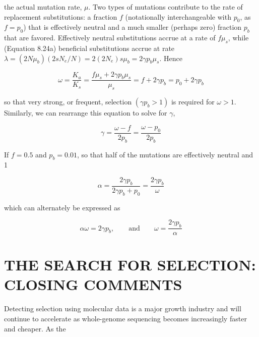 \documentclass{article}
\begin{document}
the actual mutation rate,  $ \mu $. Two types of mutations contribute to the rate of replacement substitutions: a fraction  $ f $ (notationally interchangeable with  $ p_0 $, as  $ f = p_0 $) that is effectively neutral and a much smaller (perhaps zero) fraction  $ p_b $ that are favored. Effectively neutral substitutions accrue at a rate of  $ f\mu_s $, while (Equation 8.24a) beneficial substitutions accrue at rate  $ \lambda = (2N\mu_b)(2sN_e/N) = 2(2N_e)s\mu_b = 2\gamma p_b\mu_s $. Hence

\begin{equation}
\omega=\frac{K_{a}}{K_{s}}=\frac{f\mu_{s}+2\gamma p_{b}\mu_{s}}{\mu_{s}}=f+2\gamma p_{b}=p_{0}+2\gamma p_{b}
\tag{10.25a}
\label{eq:10_25a}
\end{equation}

so that very strong, or frequent, selection  $ (\gamma p_b > 1) $ is required for  $ \omega > 1 $. Similarly, we can rearrange this equation to solve for  $ \gamma $,

\begin{equation}
\gamma=\frac{\omega-f}{2p_{b}}=\frac{\omega-p_{0}}{2p_{b}}
\tag{10.25b}
\label{eq:10_25b}
\end{equation}

If $f = 0.5$ and $p_b = 0.01$, so that half of the mutations are effectively neutral and 1%

\begin{equation}
\alpha=\frac{2\gamma p_{b}}{2\gamma p_{b}+p_{0}}=\frac{2\gamma p_{b}}{\omega}
\tag{10.25c}
\label{eq:10_25c}
\end{equation}

which can alternately be expressed as

\begin{equation}
\alpha\omega=2\gamma p_{b},\qquad\mathrm{a n d}\qquad\omega=\frac{2\gamma p_{b}}{\alpha}
\tag{10.25d}
\label{eq:10_25d}
\end{equation}

\section{THE SEARCH FOR SELECTION: CLOSING COMMENTS}
Detecting selection using molecular data is a major growth industry and will continue to accelerate as whole-genome sequencing becomes increasingly faster and cheaper. As the
\end{document}
